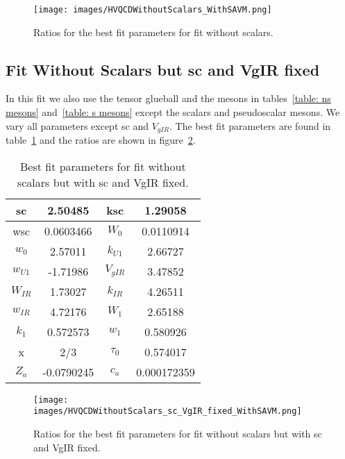 \documentclass[a4paper,12pt]{article}
\begin{document}
\begin{figure}
  \center
  \texttt{[image: images/HVQCDWithoutScalars\_WithSAVM.png]} 
  \caption{Ratios for the best fit parameters for fit without scalars.}
  \label{figure: fit without scalars}
\end{figure}


\subsection{Fit Without Scalars but sc and VgIR fixed}

In this fit we also use the tensor glueball and the mesons in tables~\ref{table: ns mesons} and~\ref{table: s mesons} except the scalars and pseudoscalar mesons. We vary all parameters except sc and $V_{gIR}$. The best fit parameters are found in table~\ref{table: fit without scalars sc VgIR fixed} and the ratios are shown in figure~\ref{figure: fit without scalars sc VgIR fixed}.

\begin{table}
\centering
\begin{tabular}{ | c | c | c | c |}
\hline
sc & 2.50485 & ksc & 1.29058 \\
\hline
wsc & 0.0603466 & $W_0$ & 0.0110914 \\
\hline
$w_0$ & 2.57011 & $k_{U1}$ & 2.66727  \\
\hline
$w_{U1}$ & -1.71986 & $V_{gIR}$ & 3.47852 \\
\hline
$W_{IR}$ & 1.73027 & $k_{IR}$ & 4.26511 \\
\hline
$w_{IR}$ & 4.72176 & $W_1$ & 2.65188 \\
\hline
$k_1$ & 0.572573 & $w_1$ & 0.580926 \\
\hline
x & 2/3& $\tau_0$ & 0.574017\\
\hline
$Z_a$ & -0.0790245 & $c_a$ & 0.000172359 \\
\hline
\end{tabular}
\caption{Best fit parameters for fit without scalars but with sc and VgIR fixed.}
\label{table: fit without scalars sc VgIR fixed} 
\end{table}

\begin{figure}
  \center
  \texttt{[image: images/HVQCDWithoutScalars\_sc\_VgIR\_fixed\_WithSAVM.png]} 
  \caption{Ratios for the best fit parameters for fit without scalars but with sc and VgIR fixed.}
  \label{figure: fit without scalars sc VgIR fixed}
\end{figure}
\end{document}
